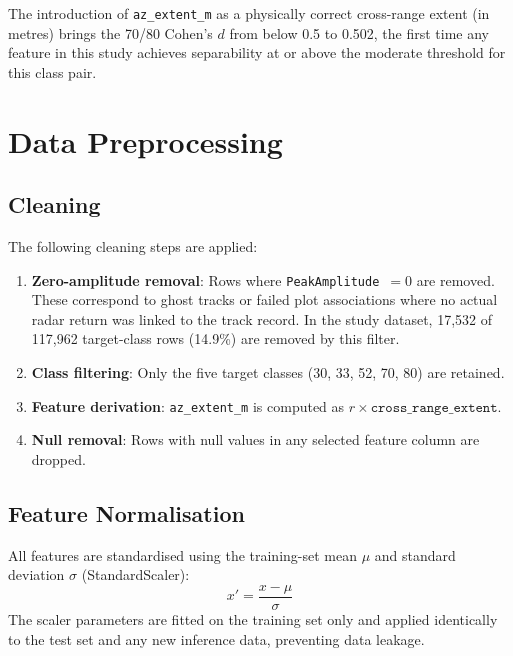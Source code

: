 \documentclass[12pt, a4paper]{article}
\begin{document}
The introduction of \texttt{az\_extent\_m} as a physically correct cross-range
extent (in metres) brings the 70/80 Cohen's $d$ from below 0.5 to 0.502,
the first time any feature in this study achieves separability at or above
the moderate threshold for this class pair.

\section{Data Preprocessing}
\label{sec:preprocessing}

\subsection{Cleaning}
\label{sec:cleaning}

The following cleaning steps are applied:
\begin{enumerate}
    \item \textbf{Zero-amplitude removal}: Rows where \texttt{PeakAmplitude}~$= 0$
          are removed. These correspond to ghost tracks or failed plot associations
          where no actual radar return was linked to the track record.
          In the study dataset, 17,532 of 117,962 target-class rows (14.9\%) are
          removed by this filter.
    \item \textbf{Class filtering}: Only the five target classes
          (30, 33, 52, 70, 80) are retained.
    \item \textbf{Feature derivation}: \texttt{az\_extent\_m} is computed as
          $r \times \texttt{cross\_range\_extent}$.
    \item \textbf{Null removal}: Rows with null values in any selected feature
          column are dropped.
\end{enumerate}

\subsection{Feature Normalisation}
\label{sec:normalisation}

All features are standardised using the training-set mean $\mu$ and standard
deviation $\sigma$ (StandardScaler):
\begin{equation}
    x' = \frac{x - \mu}{\sigma}
\end{equation}
The scaler parameters are fitted on the training set only and applied
identically to the test set and any new inference data, preventing data leakage.
\end{document}
